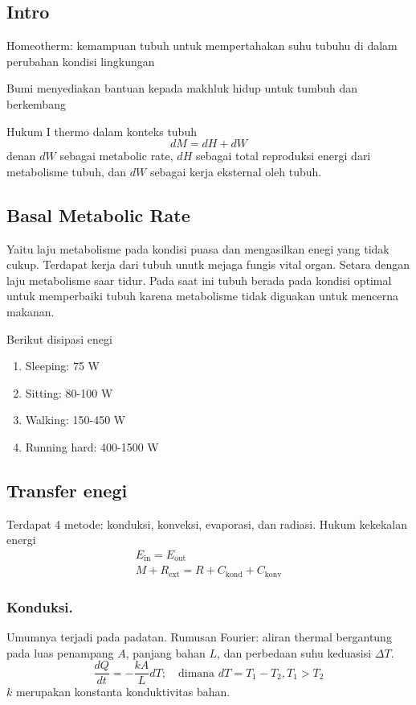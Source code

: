 \documentclass[../../../main.tex]{subfiles}
\begin{document}
\subsection{Intro}
Homeotherm: kemampuan tubuh untuk mempertahakan suhu tubuhu di dalam perubahan kondisi lingkungan

Bumi menyediakan bantuan kepada makhluk hidup untuk tumbuh dan berkembang

Hukum I thermo dalam konteks tubuh
\begin{equation*}
    dM=dH+dW
\end{equation*}
denan $dW$ sebagai metabolic rate, $dH$ sebagai total reproduksi energi dari metabolisme tubuh, dan $dW$ sebagai kerja eksternal oleh tubuh. 

\subsection{Basal Metabolic Rate}
Yaitu laju metabolisme pada kondisi puasa dan mengasilkan enegi yang tidak cukup. Terdapat kerja dari tubuh unutk mejaga fungis vital organ. Setara dengan laju metabolisme saar tidur. Pada saat ini tubuh berada pada kondisi optimal untuk memperbaiki tubuh karena metabolisme tidak diguakan untuk mencerna makanan.

Berikut disipasi enegi
\begin{enumerate}
    \item Sleeping: 75 W 
    \item Sitting: 80-100 W 
    \item Walking: 150-450 W 
    \item Running hard: 400-1500 W 
\end{enumerate}

\subsection{Transfer enegi}
Terdapat 4 metode: konduksi, konveksi, evaporasi, dan radiasi. Hukum kekekalan energi 
\begin{align*}
    E_\text{in}=E_\text{out}\\
    M+R_\text{ext}=R+C_\text{kond}+C_\text{konv}
\end{align*}

\subsubsection{Konduksi.} Umumnya terjadi pada padatan. Rumusan Fourier: aliran thermal bergantung pada luas penampang $A$, panjang bahan $L$, dan perbedaan suhu keduasisi $\Delta T$. 
\begin{equation*}
    \frac{dQ}{dt}=-\frac{kA}{L}dT;\quad\text{dimana }dT=T_1-T_2,T_1>T_2
\end{equation*}
$k$ merupakan konstanta konduktivitas bahan. 
\end{document}
